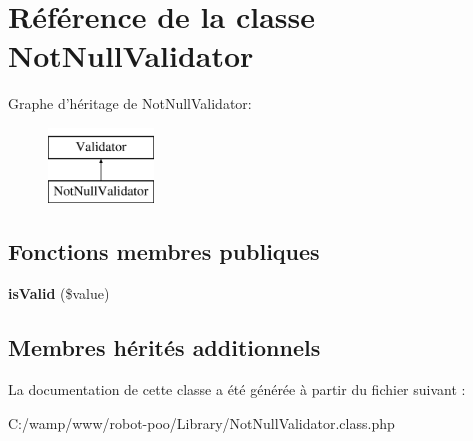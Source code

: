 \hypertarget{class_library_1_1_not_null_validator}{\section{Référence de la classe Not\+Null\+Validator}
\label{class_library_1_1_not_null_validator}
}
Graphe d'héritage de Not\+Null\+Validator\+:\begin{figure}[H]
\begin{center}
\leavevmode
\includegraphics[height=2.000000cm]{class_library_1_1_not_null_validator}
\end{center}
\end{figure}
\subsection*{Fonctions membres publiques}
\begin{DoxyCompactItemize}
\item 
\hypertarget{class_library_1_1_not_null_validator_a72063d2e922edda5321b1970297eb0c3}{{\bfseries is\+Valid} (\$value)}\label{class_library_1_1_not_null_validator_a72063d2e922edda5321b1970297eb0c3}

\end{DoxyCompactItemize}
\subsection*{Membres hérités additionnels}


La documentation de cette classe a été générée à partir du fichier suivant \+:\begin{DoxyCompactItemize}
\item 
C\+:/wamp/www/robot-\/poo/\+Library/Not\+Null\+Validator.\+class.\+php\end{DoxyCompactItemize}

